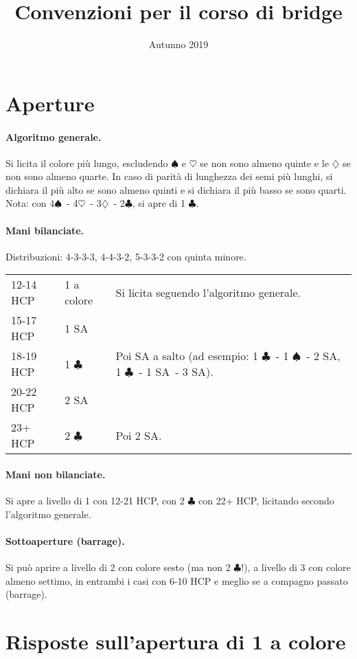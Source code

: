 \documentclass[a4paper,10pt]{article}
\title{Convenzioni per il corso di bridge}
\date{Autunno 2019}
\renewcommand{\c}{$\clubsuit$\xspace}
\renewcommand{\d}{$\diamondsuit$\xspace}
\newcommand{\h}{$\heartsuit$\xspace}
\newcommand{\s}{$\spadesuit$\xspace}
\newcommand{\sa}{SA\xspace}
\newcommand{\smallspace}{\vskip0.3cm}
\newenvironment{threecol}
  {\smallspace\noindent\begin{tabular}{l l p{0.78\textwidth}}}
  {\end{tabular}\smallspace}
\begin{document}
\maketitle

\section{Aperture}

\paragraph{Algoritmo generale.}
Si licita il colore più lungo, escludendo \s e \h se non sono almeno quinte e le \d se non sono almeno quarte.
In caso di parità di lunghezza dei semi più lunghi, si dichiara il più alto se sono almeno quinti e si dichiara il più basso se sono quarti.
Nota: con 4\s\ - 4\h\ - 3\d\ - 2\c, si apre di 1 \c.

\paragraph{Mani bilanciate.} Distribuzioni: 4-3-3-3, 4-4-3-2, 5-3-3-2 con quinta minore.

\begin{threecol}
 12-14 HCP & 1 a colore & Si licita seguendo l'algoritmo generale.\\
 15-17 HCP & 1 \sa\\
 18-19 HCP & 1 \c & Poi \sa a salto (ad esempio: 1 \c\ - 1 \s\ - 2 \sa, 1 \c\ - 1 \sa\ - 3 \sa).\\
 20-22 HCP & 2 \sa\\
 23+ HCP & 2 \c & Poi 2 \sa.
\end{threecol}

\paragraph{Mani non bilanciate.} Si apre a livello di 1 con 12-21 HCP, con 2 \c con 22+ HCP, licitando secondo l'algoritmo generale.

\paragraph{Sottoaperture (barrage).} Si può aprire a livello di 2 con colore sesto (ma non 2 \c!), a livello di 3 con colore almeno settimo, in entrambi i casi con 6-10 HCP e meglio se a compagno passato (barrage).

\section{Risposte sull'apertura di 1 a colore}
\end{document}
